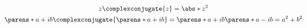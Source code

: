\begin{multicols}{2}
\begin{CheatsheetEntryFrame}
        \begin{gather*}
            z \complexconjugate{z} = \abs*{z}^2 \\
            \parens*{a + ib} \complexconjugate{\parens*{a + ib}} = \parens*{a + ib} \parens*{a - ib} = a^2 + b^2
        \end{gather*}
        
    \end{CheatsheetEntryFrame}

    \MulticolsBreak

    \MulticolsPhantomPlaceholder

\end{multicols}

